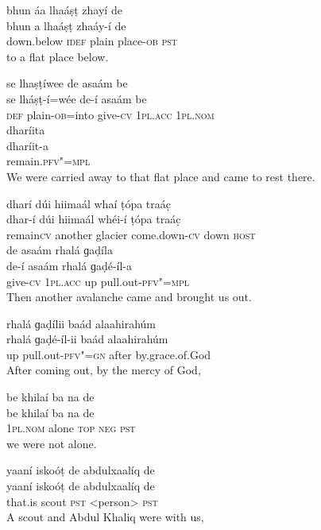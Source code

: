 \begin{exe}
\ex
\label{ex:13}
\glll bhun	áa	lhaáṣṭ	zhayí	de \\
bhun	a	lhaáṣṭ	zhaáy-í	de \\
down.below	\textsc{idef}	plain	place-\textsc{ob}	\textsc{pst} \\
\glt to a flat place below.

\ex
\label{ex:14}
\glll se	lhaṣṭíwee	de	asaám	be \\
se	lháṣṭ-í=wée	de-í	asaám	be \\
\textsc{def}	plain-\textsc{ob}=into	give-\textsc{cv} \textsc{1pl.acc} \textsc{1pl.nom} \\
\glll dharíita \\
dharíit-a \\
remain.\textsc{pfv"=mpl} \\
\glt We were carried away to that flat place and came to rest there.

\ex
\label{ex:15}
\glll dharí	dúi	hiimaál	whaí	ṭópa	traác̣  \\
dhar-í	dúi	hiimaál	whéi-í	ṭópa	traác̣  \\
remain\textsc{cv}	another	glacier	come.down-\textsc{cv}	down \textsc{host} \\
\glll de	asaám	rhalá	ɡaḍíla \\
de-í	asaám	rhalá	ɡaḍé-íl-a \\
give-\textsc{cv} \textsc{1pl.acc}	up	pull.out-\textsc{pfv"=mpl} \\
\glt Then another avalanche came and brought us out.

\ex
\label{ex:16}
\glll rhalá	ɡaḍílii	baád	alaahirahúm \\
rhalá	ɡaḍé-íl-ii	baád	alaahirahúm \\
up	pull.out-\textsc{pfv"=gn}	after	by.grace.of.God \\
\glt After coming out, by the mercy of God,
 
\ex
\label{ex:17}
\glll be	khilaí	ba	na	de \\
be	khilaí	ba	na	de \\
\textsc{1pl.nom}	alone \textsc{top} \textsc{neg} 	\textsc{pst} \\
\glt we were not alone.

\ex
\label{ex:18}
\glll yaaní	iskoóṭ	de	abdulxaalíq	de \\
yaaní	iskoóṭ	de	abdulxaalíq	de \\
that.is	scout \textsc{pst}	<person>	\textsc{pst} \\
\glt A scout and Abdul Khaliq were with us,


\end{exe}
